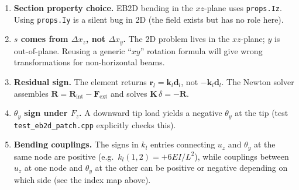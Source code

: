 \documentclass[11pt,a4paper]{article}
\newcommand{\bmath}[1]{\boldsymbol{#1}}
\begin{document}
\begin{enumerate}
    \item \textbf{Section property choice.} EB2D bending in the $xz$-plane uses \texttt{props.Iz}. Using \texttt{props.Iy} is a silent bug in 2D (the field exists but has no role here).
    \item \textbf{$s$ comes from $\Delta x_z$, not $\Delta x_y$.} The 2D problem lives in the $xz$-plane; $y$ is out-of-plane. Reusing a generic ``$xy$'' rotation formula will give wrong transformations for non-horizontal beams.
    \item \textbf{Residual sign.} The element returns $\bmath{r}_l = \bmath{k}_l \bmath{d}_l$, not $-\bmath{k}_l \bmath{d}_l$. The Newton solver assembles $\bmath{R} = \bmath{R}_{\mathrm{int}} - \bmath{F}_{\mathrm{ext}}$ and solves $\bmath{K}\,\delta = -\bmath{R}$.
    \item \textbf{$\theta_y$ sign under $F_z$.} A downward tip load yields a negative $\theta_y$ at the tip (test \texttt{test\_eb2d\_patch.cpp} explicitly checks this).
    \item \textbf{Bending couplings.} The signs in $k_l$ entries connecting $u_z$ and $\theta_y$ at the same node are positive (e.g.\ $k_l(1,2) = +6EI/L^2$), while couplings between $u_z$ at one node and $\theta_y$ at the other can be positive or negative depending on which side (see the index map above).
\end{enumerate}
\end{document}

